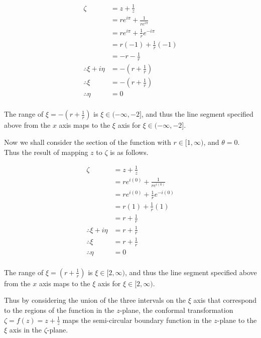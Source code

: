 \documentclass[a4paper]{article}
\begin{document}
\begin{enumerate}[label=\textbf{\arabic*.}]
\begin{enumerate}
\begin{enumerate}
			\begin{align*}
			\zeta & = z + \frac{1}{z}\\
			& = re^{i\pi} + \frac{1}{re^{i\pi}}\\
			& = re^{i\pi} + \frac{1}{r}e^{-i\pi}\\
			& = r(-1) + \frac{1}{r}(-1)\\
			& = -r - \frac{1}{r}\\
			\therefore \xi + i\eta & = -\left(r + \frac{1}{r}\right)\\
			\therefore \xi & = -\left(r + \frac{1}{r}\right)\\
			\therefore \eta & = 0\\
			\end{align*}

			The range of $\displaystyle{\xi = -\left(r + \frac{1}{r}\right)}$ is $\displaystyle{\xi \in (-\infty,-2]}$, and thus the line segment specified above from the $\displaystyle{x}$ axis maps to the $\displaystyle{\xi}$ axis for $\displaystyle{\xi \in (-\infty,-2]}$.

			\bigbreak

			Now we shall consider the section of the function with $\displaystyle{r \in [1,\infty)}$, and $\displaystyle{\theta = 0}$. Thus the result of mapping $\displaystyle{z}$ to $\displaystyle{\zeta}$ is as follows.

			\begin{align*}
			\zeta & = z + \frac{1}{z}\\
			& = re^{i(0)} + \frac{1}{re^{i(0)}}\\
			& = re^{i(0)} + \frac{1}{r}e^{-i(0)}\\
			& = r(1) + \frac{1}{r}(1)\\
			& = r + \frac{1}{r}\\
			\therefore \xi + i\eta & = r + \frac{1}{r}\\
			\therefore \xi & = r + \frac{1}{r}\\
			\therefore \eta & = 0\\
			\end{align*}

			The range of $\displaystyle{\xi = \left(r + \frac{1}{r}\right)}$ is $\displaystyle{\xi \in [2,\infty)}$, and thus the line segment specified above from the $\displaystyle{x}$ axis maps to the $\displaystyle{\xi}$ axis for $\displaystyle{\xi \in [2,\infty)}$.

			\bigbreak

			Thus by considering the union of the three intervals on the $\displaystyle{\xi}$ axis that correspond to the regions of the function in the $\displaystyle{z}$-plane, the conformal transformation $\displaystyle{\zeta = f(z) = z + \frac{1}{z}}$ maps the semi-circular boundary function in the $\displaystyle{z}$-plane to the $\displaystyle{\xi}$ axis in the $\displaystyle{\zeta}$-plane.


\end{enumerate}
\end{enumerate}
\end{enumerate}
\end{document}
